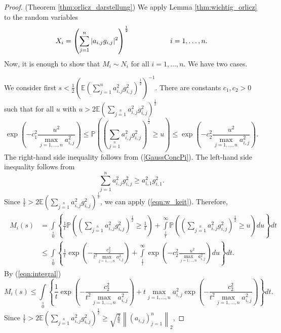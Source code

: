 \documentclass[12pt,a4paper]{article}
\newcommand{\Pv}{\mathbb{P}}
\newcommand{\Ex}{\mathbb{E}}
\newcommand{\norm}[1]{\left \lVert#1 \right\rVert}
\begin{document}
\begin{proof}(Theorem \ref{thm:orlicz_darstellung})
	We apply Lemma \ref{thm:wichtig_orlicz} to the random variables
	$$
	X_{i}
	=\left(\sum_{j=1}^{n}|a_{i,j}g_{i,j}|^{2}\right)^{\frac{1}{2}}
	\hskip 20mm i=1,\dots,n.
	$$
Now, it is enough to show that $M_i\sim N_i$ for all $i=1,\dots,n$. We have two  cases.
\par
We consider first $s<\frac{1}{2}\left(\Ex\left(\sum_{j=1}^na_{i,j}^2g_{i,j}^2\right)^{\frac{1}{2}}\right)^{-1}$. 
There are constants $c_{1},c_{2}>0$ such that for all $u$ with $u>2\Ex\left(\sum\limits_{j=1}\limits^na_{i,j}^2g_{i,j}^2\right)^{\frac{1}{2}}$ 
\begin{equation}\label{eqn:w_keit}
\exp\left(-c_{1}^{2}\frac{u^2}{\max\limits_{j=1,\dots,n}a_{i,j}^2}\right)
\leq	\Pv\left(\left(\sum\limits_{j=1}\limits^na_{i,j}^2g_{i,j}^2\right)^{\frac{1}{2}}\geq u\right)\leq  \exp\left(-c_{2}^{2}\frac{u^2}{\max\limits_{j=1,\dots,n}a_{i,j}^2}\right).
\end{equation}
The right-hand side inequality follows from (\ref{GaussConcPi}).
The left-hand side inequality follows from
$$
\sum_{j=1}^{n}a_{i,j}^{2}g_{i,j}^{2}\geq a_{i,1}^{2}g_{i,1}^{2}.
$$
Since $\frac{1}{t}>2\Ex\left(\sum\limits_{j=1}\limits^{n}a_{i,j}^2g_{i,j}^2\right)^{\frac{1}{2}}$, we can apply (\ref{eqn:w_keit}).  Therefore,
\begin{eqnarray*}
\left.\begin{split}
M_i(s)
	& =\int\limits_{0}\limits^s\left\{\frac{1}{t}\Pv
	\left(\left(\sum\limits_{j=1}\limits^{n}a_{i,j}^2g_{i,j}^2\right)^{\frac{1}{2}}
	\geq\frac{1}{t}\right)+\int\limits_{\frac{1}{t}}^{\infty}\Pv\left(\left(\sum\limits_{j=1}\limits^na_{i,j}^2g_{i,j}^2\right)^{\frac{1}{2}}\geq u\right)du\right\}dt\\
	&\leq \int\limits_{0}\limits^s\left\{\frac{1}{t}\exp\left(-\frac{c_{2}^{2}}{t^2\max\limits_{j=1,\dots,n}a_{i,j}^2}\right)+\int\limits_{\frac{1}{t}}^{\infty}\exp\left(-c_{2}^{2}\frac{u^2}{\max\limits_{j=1,\dots,n}a_{i,j}^2}\right)du\right\}dt.
	\end{split}\right.
\end{eqnarray*}
	By (\ref{eqn:integral})
	$$
	M_i(s)\leq \int\limits_0\limits^{s}\left\{\frac{1}{t}\exp\left(-\frac{c_{2}^{2}}{t^2\max\limits_{j=1,\dots,n}a_{i,j}^2}\right)+t\max\limits_{j=1,\dots,n}a_{i,j}^2\exp\left(-\frac{c_{2}^{2}}{t^2\max\limits_{j=1,\dots,n}a_{i,j}^2}\right)\right\}dt.
	$$
Since 
$\frac{1}{t}>2\Ex\left(\sum\limits_{j=1}\limits^{n}a_{i,j}^2g_{i,j}^2\right)^{\frac{1}{2}}
\geq\sqrt{\frac{2}{\pi}}\norm{(a_{i,j})_{j=1}^n}_2$, 

\end{proof}
\end{document}
